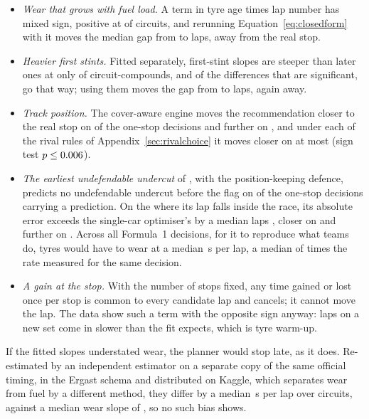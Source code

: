 \documentclass[11pt,a4paper]{article}
\begin{document}
\begin{itemize}
\item \emph{Wear that grows with fuel load.} A term in tyre age times lap number
has mixed sign, positive at \InterPositive{} of \InterN{} circuits, and
rerunning Equation~\ref{eq:closedform} with it moves the median gap from
\InterGapWithout{} to \InterGapWith{} laps, away from the real stop.
\item \emph{Heavier first stints.} Fitted separately, first-stint slopes are
steeper than later ones at only \FirstSteeper{} of \FirstPairs{}
circuit-compounds, and of the \FirstSig{} differences that are significant,
\FirstSigSteeper{} go that way; using them moves the gap from
\FirstGapPooled{} to \FirstGapSplit{} laps, again away.
\item \emph{Track position.} The cover-aware engine moves the recommendation
closer to the real stop on \RetestCloser{} of the \NRetest{} one-stop
decisions and further on \RetestFurther{}, and under each of the
\NRetestRules{} rival rules of Appendix~\ref{sec:rivalchoice} it moves closer on at most
\RetestCloserMax{} (sign test $p \le 0.006{}$).
\item \emph{The earliest undefendable undercut} of \citet{salminen2026}, with
the position-keeping defence, predicts no undefendable undercut before the
flag on \NRetestEuuAfterFlag{} of the \NRetestPredicted{} one-stop decisions
carrying a prediction. On the \NRetestEuuInside{} where its lap falls inside
the race, its absolute error exceeds the single-car optimiser's by a median
\RetestEuuInsideAbsDiff{} laps \RetestEuuInsideAbsDiffCi{}, closer on
\RetestEuuInsideCloser{} and further on \RetestEuuInsideFurther{}. Across all
Formula~1 decisions, for it to reproduce what teams do, tyres would have to wear
at a median \DOneImpliedTheta{}\,s per lap, a median of \DOneThetaRatio{} times
the rate measured for the same decision.
\item \emph{A gain at the stop.} With the number of stops fixed, any time
gained or lost once per stop is common to every candidate lap and cancels;
it cannot move the lap. The data show such a term with the opposite sign
anyway: laps on a new set come in slower than the fit expects, which is tyre
warm-up.
\end{itemize}
If the fitted slopes understated wear, the planner would stop late, as it does.
Re-estimated by an independent estimator on a separate copy of the same
official timing, in the Ergast schema and distributed on Kaggle, which
separates wear from fuel by a different method, they differ by
a median \CrossSourceDiff{}\,s per lap over \CrossSourceN{} circuits, against a
median wear slope of \CrossSourceWear{}, so no such bias shows.
\end{document}
